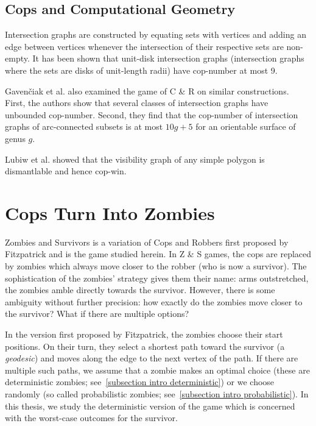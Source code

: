 \subsection{Cops and Computational Geometry}

Intersection graphs are constructed by equating sets with vertices and adding an edge between vertices whenever the intersection of their respective sets are non-empty. It has been shown \cite{beveridge2011cops} that unit-disk intersection graphs (intersection graphs where the sets are disks of unit-length radii) have cop-number at most 9.

Gaven{\v{c}}iak et al. \cite{gavenvciak2018cops} also examined the game of C \& R on similar constructions. First, the authors show that several classes of intersection graphs have unbounded cop-number. Second, they find that the cop-number of intersection graphs of arc-connected subsets is at most $10g+5$ for an orientable surface of genus $g$.

Lubiw et al. \cite{lubiw2017visibility} showed that the visibility graph of any simple polygon is dismantlable and hence cop-win.

\section{Cops Turn Into Zombies}

Zombies and Survivors is a variation of Cops and Robbers first proposed by Fitzpatrick \cite{fitzpatrick2016deterministic} and is the game studied herein. In Z \& S games, the
cops are replaced by zombies which always move closer to the robber (who is now a survivor). The sophistication of the zombies' strategy gives them their name:  arms outstretched, the zombies amble directly towards the survivor. However, there is some ambiguity without further precision: how exactly do the zombies move closer to the survivor? What if there are multiple options?

In the version first proposed by Fitzpatrick, the zombies choose their start positions. On their turn, they select a shortest path toward the survivor (a \textit{geodesic}) and moves along the edge to the next vertex of the path. If there are multiple such paths, we assume that a zombie makes an optimal choice (these are deterministic zombies; see~\ref{subsection intro deterministic}) or we choose randomly (so called probabilistic zombies; see~\ref{subsection intro probabilistic}). In this thesis, we study the deterministic version of the game which is concerned with the worst-case outcomes for the survivor.

